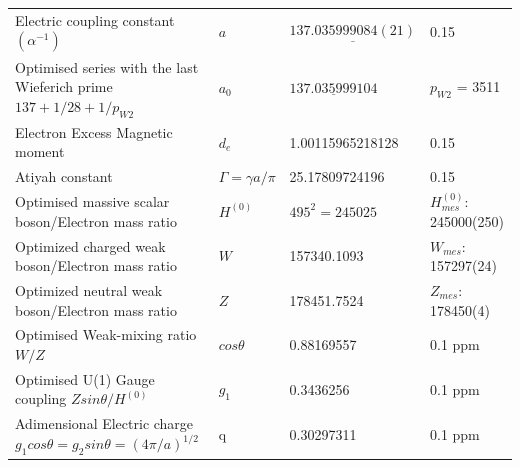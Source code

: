 \documentclass[a4paper,9pt]{article}
\begin{document}
\begin{table}
\begin{tabular}{llll}
    Electric coupling constant $(\alpha^{-1})$  & $a$    & $\underline {137.035999084(21)}$ & 0.15 \\
    
    Optimised series with the last Wieferich prime $137 + 1/28 + 1/p_{W2}$  & $a_0$    & $\underline {137.035999104}$ & $p_{W2}$ = 3511  \\
    
    Electron Excess Magnetic moment  & $d_e$    & 1.00115965218128 & 0.15 \\
    Atiyah constant & $\Gamma= \gamma a/\pi$    & 25.17809724196  & 0.15 \\ 
    Optimised massive scalar boson/Electron mass ratio  & $H^{(0)}$ & $ 495^2 = 245025$  & $H^{(0)}_{mes}$: 245000(250)  \\
    
    Optimized  charged weak  boson/Electron mass ratio  & $W$ & 157340.1093  & \cite{Sanchez2} $W_{mes}$: 157297(24)  \\     
    
    Optimized  neutral weak boson/Electron mass ratio  & $Z$ & 178451.7524  & \cite{Sanchez2} $Z_{mes}$: 178450(4)\\     
   
  
  Optimised Weak-mixing ratio $W/Z$ & $cos\theta$ & 0.88169557 & 0.1 ppm \\
  
  Optimised U(1) Gauge coupling $Zsin\theta /H^{(0)}$ &  $g_1$ & 0.3436256 &  0.1 ppm \\
  
  Adimensional Electric charge $g_1 cos \theta = g_2 sin \theta = (4\pi/a)^{1/2}$  & q & 0.30297311 & 0.1 ppm \\
  

\end{tabular}
\end{table}
\end{document}
